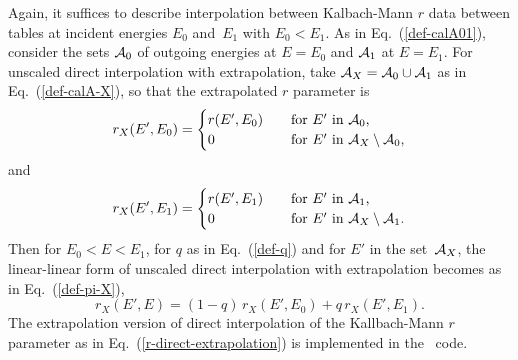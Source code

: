 Again, it suffices to describe interpolation between Kalbach-Mann $r$
data between tables at incident energies $E_0$ and~$E_1$ with
$E_0 < E_1$.  As in Eq.~(\ref{def-calA01}),
consider the sets ${\cal A}_0$ of outgoing energies
at $E = E_0$ and ${\cal A}_1$ at $E = E_1$.  For unscaled direct interpolation
with extrapolation, take ${\cal A}_X = {\cal A}_0 \cup {\cal A}_1$ as in
Eq.~(\ref{def-calA-X}), so that the extrapolated $r$ parameter is
\begin{equation*}
  r_X(E', E_0 ) = \begin{cases}
    r(E', E_0 ) &\quad \text{for $E'$ in ${\cal A}_0$,} \\
    0 &\quad \text{for $E'$ in ${\cal A}_X \setminus {\cal A}_0$,}
  \end{cases}
\end{equation*}
and
\begin{equation*}
  r_X(E', E_1 ) = \begin{cases}
    r(E', E_1 ) &\quad \text{for $E'$ in ${\cal A}_1$,} \\
    0 &\quad \text{for $E'$ in ${\cal A}_X \setminus {\cal A}_1$.}
  \end{cases}
\end{equation*}
Then for $E_0 < E < E_1$, for $q$ as in Eq.~(\ref{def-q}) and for
$E'$ in the set~${\cal A}_X$, the linear-linear form of unscaled direct interpolation
with extrapolation becomes as in Eq.~(\ref{def-pi-X}),
\begin{equation}
  r_X(E', E ) = ( 1 - q )\, r_X(E', E_0 ) + q\, r_X(E', E_1 ).
  \label{r-direct-extrapolation}
\end{equation}
The extrapolation version of direct interpolation of the Kallbach-Mann
$r$ parameter as in Eq.~(\ref{r-direct-extrapolation}) is implemented in
the \gettransfer\ code.

